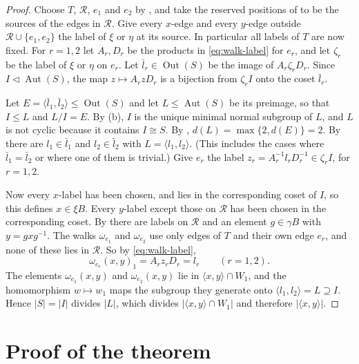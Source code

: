 \documentclass[11pt,colorlinks]{charlie}
\DeclareMathOperator{\Aut}{Aut}
\DeclareMathOperator{\Out}{Out}
\newcommand{\gen}[1]{\langle #1\rangle}
\begin{document}
\begin{proof}
Choose $T$, $\mathcal R$, $e_1$ and $e_2$ by , and take the reserved positions of  to be the sources of the edges in $\mathcal R$. Give every $x$-edge and every $y$-edge outside $\mathcal R\cup\{e_1,e_2\}$ the label of $\xi$ or $\eta$ at its source. In particular all labels of $T$ are now fixed. For $r=1,2$ let $A_r,D_r$ be the products in \eqref{eq:walk-label} for $e_r$, and let $\zeta_r$ be the label of $\xi$ or $\eta$ on $e_r$. Let $\bar l_r\in\Out(S)$ be the image of $A_r\zeta_rD_r$. Since $I\lhd\Aut(S)$, the map $z\mapsto A_rzD_r$ is a bijection from $\zeta_rI$ onto the coset $\bar l_r$.

Let $E=\gen{\bar l_1,\bar l_2}\le\Out(S)$ and let $L\le\Aut(S)$ be its preimage, so that $I\le L$ and $L/I=E$. By (b), $I$ is the unique minimal normal subgroup of $L$, and $L$ is not cyclic because it contains $I\cong S$. By , $d(L)=\max\{2,d(E)\}=2$. By  there are $l_1\in\bar l_1$ and $l_2\in\bar l_2$ with $L=\gen{l_1,l_2}$. (This includes the cases where $\bar l_1=\bar l_2$ or where one of them is trivial.) Give $e_r$ the label $z_r=A_r^{-1}l_rD_r^{-1}\in\zeta_rI$, for $r=1,2$.

Now every $x$-label has been chosen, and lies in the corresponding coset of $I$, so this defines $x\in\xi B$. Every $y$-label except those on $\mathcal R$ has been chosen in the corresponding coset. By  there are labels on $\mathcal R$ and an element $g\in\gamma B$ with $y=gxg^{-1}$. The walks $\omega_{e_1}$ and $\omega_{e_2}$ use only edges of $T$ and their own edge $e_r$, and none of these lies in $\mathcal R$. So by \eqref{eq:walk-label},
\[
 \omega_{e_r}(x,y)_1=A_rz_rD_r=l_r\qquad(r=1,2).
\]
The elements $\omega_{e_1}(x,y)$ and $\omega_{e_2}(x,y)$ lie in $\gen{x,y}\cap W_1$, and the homomorphism $w\mapsto w_1$ maps the subgroup they generate onto $\gen{l_1,l_2}=L\supseteq I$. Hence $|S|=|I|$ divides $|L|$, which divides $|\gen{x,y}\cap W_1|$ and therefore $|\gen{x,y}|$.
\end{proof}

\section{Proof of the theorem}\label{sec:proof}
\end{document}
